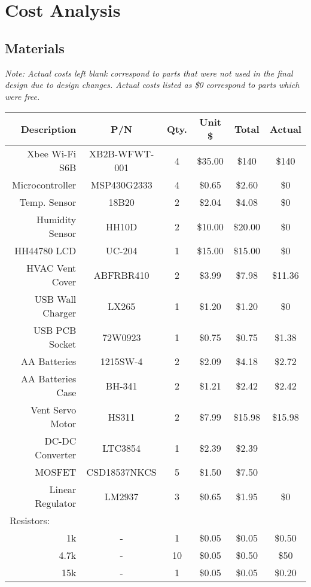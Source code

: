 \section{Cost Analysis}
\subsection{Materials}
\emph{ Note: Actual costs left blank correspond to parts that were not used in the final design due to design changes.  Actual costs listed as \$0 correspond to parts which were free.}
\begin{center}
\begin{tabular}{|r|c|c|c|c|c|}
\hline
{Description} & {P/N} & {Qty.} & {Unit \$} & {Total} & {Actual}\\
\hline
\hline
Xbee Wi-Fi S6B & XB2B-WFWT-001 & 4 & \$35.00 & \$140 & \$140\\
\hline
Microcontroller & MSP430G2333 & 4 & \$0.65 & \$2.60 & \$0\\
\hline
Temp. Sensor & 18B20 & 2 & \$2.04 & \$4.08 & \$0\\
\hline
Humidity Sensor & HH10D & 2 & \$10.00 & \$20.00 & \$0\\
\hline
HH44780 LCD & UC-204 & 1 & \$15.00 & \$15.00 & \$0\\
\hline
HVAC Vent Cover & ABFRBR410 & 2 & \$3.99 & \$7.98 & \$11.36\\
\hline
USB Wall Charger & LX265 & 1 & \$1.20 & \$1.20 & \$0\\
\hline
USB PCB Socket & 72W0923 & 1 & \$0.75 & \$0.75 & \$1.38\\
\hline
AA Batteries & 1215SW-4 & 2 & \$2.09 & \$4.18 & \$2.72\\
\hline
AA Batteries Case & BH-341 & 2 & \$1.21 & \$2.42 & \$2.42\\
\hline
Vent Servo Motor & HS311 & 2 & \$7.99 & \$15.98 & \$15.98\\
\hline
DC-DC Converter & LTC3854 & 1 & \$2.39 & \$2.39 &\\
\hline
MOSFET & CSD18537NKCS & 5 & \$1.50 & \$7.50 &\\
\hline
Linear Regulator & LM2937 & 3 & \$0.65 & \$1.95 & \$0\\
\hline
\multicolumn{1}{|l|}{Resistors:} &   &   &   &  &\\
\hline
1k & - & 1 & \$0.05 & \$0.05 & \$0.50\\
\hline
{4.7k} & - & 10 & \$0.05 & \$0.50 & \$50\\
\hline
{15k} & - & 1 & \$0.05 & \$0.05 & \$0.20\\

\end{tabular}
\end{center}
